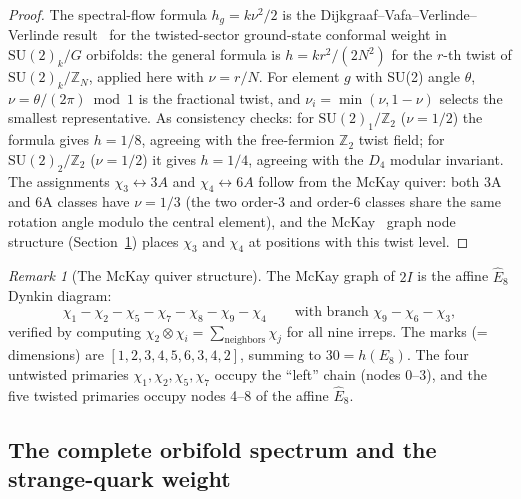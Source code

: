 \documentclass[11pt,a4paper]{article}
\theoremstyle{definition}
\theoremstyle{remark}
\newtheorem{remark}[theorem]{Remark}
\begin{document}
\begin{proof}
The spectral-flow formula $h_g = k\nu^2/2$ is the
Dijkgraaf--Vafa--Verlinde--Verlinde result~\cite{DVVV1987} for the
twisted-sector ground-state conformal weight in $\mathrm{SU}(2)_k/G$ orbifolds:
the general formula is $h = k r^2/(2N^2)$ for the $r$-th twist of
$\mathrm{SU}(2)_k/\mathbb{Z}_N$, applied here with $\nu = r/N$.
For element $g$ with SU(2) angle $\theta$, $\nu = \theta/(2\pi)\bmod 1$ is the fractional
twist, and $\nu_i = \min(\nu, 1-\nu)$ selects the smallest representative.
As consistency checks: for $\mathrm{SU}(2)_1/\mathbb{Z}_2$ ($\nu=1/2$)
the formula gives $h=1/8$, agreeing with the free-fermion $\mathbb{Z}_2$ twist field;
for $\mathrm{SU}(2)_2/\mathbb{Z}_2$ ($\nu=1/2$) it gives $h=1/4$,
agreeing with the $D_4$ modular invariant.
The assignments $\chi_3 \leftrightarrow 3A$ and $\chi_4 \leftrightarrow 6A$
follow from the McKay quiver: both 3A and 6A classes have $\nu=1/3$ (the two
order-3 and order-6 classes share the same rotation angle modulo the central element),
and the McKay~\cite{McKay1980} graph node structure
(Section~\ref{P5:subsec:mckay_graph}) places $\chi_3$ and $\chi_4$
at positions with this twist level.
\end{proof}

\begin{remark}[The McKay quiver structure]
\label{P5:subsec:mckay_graph}
The McKay graph of $2I$ is the affine $\hat{E}_8$ Dynkin diagram:
\begin{equation}
  \chi_1 - \chi_2 - \chi_5 - \chi_7 - \chi_8 - \chi_9 - \chi_4
  \qquad \text{with branch } \chi_9 - \chi_6 - \chi_3,
  \label{P5:eq:e8_quiver}
\end{equation}
verified by computing $\chi_2 \otimes \chi_i = \sum_{\text{neighbors}} \chi_j$
for all nine irreps.  The marks (= dimensions) are
$[1,2,3,4,5,6,3,4,2]$, summing to $30 = h(E_8)$.
The four untwisted primaries $\chi_1,\chi_2,\chi_5,\chi_7$ occupy the
``left'' chain (nodes 0--3), and the five twisted primaries occupy
nodes 4--8 of the affine $\hat{E}_8$.
\end{remark}

\subsection{The complete orbifold spectrum and the strange-quark weight}
\end{document}
